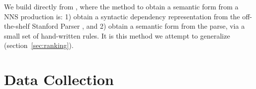\documentclass[11pt,letterpaper]{article}
\newcommand{\md}[1]{\marginpar{\scriptsize MD: #1}}
\newcommand{\lk}[1]{\marginpar{\scriptsize LK: #1}}
\renewcommand{\marginpar}[1]{}
\begin{document}

We build directly from \citet{king:dickinson:13,king:dickinson:14},
where the method to obtain a semantic form from a NNS production is:
1) obtain a syntactic dependency representation from the off-the-shelf
Stanford Parser \citep{demarneffe:ea:06, klein:manning:03}, and 2)
obtain a semantic form from the parse, via a small set of hand-written
rules.  It is this method we attempt to generalize
(section~\ref{sec:ranking}).

\section{Data Collection}
\label{sec:data}

\end{document}

